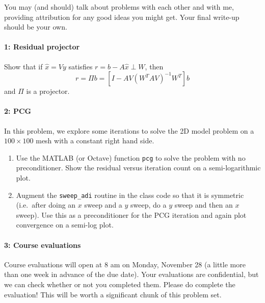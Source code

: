 \documentclass[12pt, leqno]{article} %
\begin{document}

You may (and should) talk about problems with each other and with me,
providing attribution for any good ideas you might get.  Your final
write-up should be your own.

\paragraph*{1: Residual projector}
Show that if $\hat{x} = Vy$ satisfies $r = b - A\hat{x} \perp W$, then
\[
  r = \Pi b = \left[I-AV(W^TAV)^{-1} W^T\right] b
\]
and $\Pi$ is a projector.

\paragraph*{2: PCG}
In this problem, we explore some iterations to solve the 2D model
problem on a $100 \times 100$ mesh with a constant right hand side.
\begin{enumerate}
\item Use the MATLAB (or Octave) function {\tt pcg} to solve the
  problem with no preconditioner.  Show the residual versus iteration
  count on a semi-logarithmic plot.
\item Augment the {\tt sweep\_adi} routine in the class code so that
  it is symmetric (i.e.~after doing an $x$ sweep and a $y$ sweep,
  do a $y$ sweep and then an $x$ sweep).  Use this as a preconditioner
  for the PCG iteration and again plot convergence on a semi-log plot.
\end{enumerate}

\paragraph*{3: Course evaluations}
Course evaluations will open at 8 am on Monday, November 28 (a little
more than one week in advance of the due date).  Your evaluations are
confidential, but we can check whether or not you completed them.
Please do complete the evaluation!  This will be worth a significant
chunk of this problem set.
\end{document}
